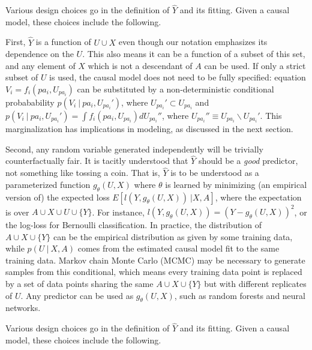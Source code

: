 
Various design choices go in the definition of $\hat Y$ and its fitting. Given a causal model, these choices include the following.

First, $\hat Y$ is a function of $U \cup X$ even though our notation emphasizes its dependence on the $U$. This also means it can be a function of a subset of this set, and any element of $X$ which is not a descendant of $A$ can be used. If only a strict subset of $U$ is used, the causal model does not need to be fully specified: equation $V_i = f_i(pa_i, U_{pa_i})$ can be substituted by a non-deterministic conditional probabability $p(V_i\ |\ pa_i, U_{pa_i}')$, where $U_{pa_i}' \subset U_{pa_i}$ and $p(V_i\ |\ pa_i, U_{pa_i}') = \int f_i(pa_i, U_{pa_i}) d U_{pa_i}''$, where $U_{pa_i}'' \equiv U_{pa_i} \backslash U_{pa_i}'$. This marginalization has implications in modeling, as discussed in the next section.

Second, any random variable generated independently will be trivially counterfactually fair. It is tacitly understood that $\hat Y$ should be a {\it good} predictor, not something like tossing a coin. That is, $\hat Y$ is to be understood as a parameterized function $g_\theta(U, X)$ where $\theta$ is learned by minimizing (an empirical version of) the expected loss $E[l(Y, g_\theta(U, X))\ | X,
  A]$, where the expectation is over $A \cup X \cup U \cup \{Y\}$. For instance, $l(Y, g_\theta(U, X)) = (Y - g_\theta(U, X))^2$, or the log-loss for Bernoulli classification.  In practice, the distribution of $A \cup X \cup \{Y\}$ can be the empirical distribution as given by some training data, while $p(U\ |\ X, A)$ comes from the estimated causal model fit to the same training data. Markov chain Monte Carlo (MCMC) may be necessary to generate samples from this conditional, which means every training data point is replaced by a set of data points sharing the same $A \cup X \cup \{Y\}$ but with different replicates of $U$. Any predictor can be used as $g_\theta(U, X)$, such as random forests and neural networks.

Various design choices go in the definition of $\hat Y$ and its fitting. Given a causal model, these choices include the following.

